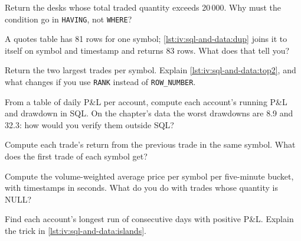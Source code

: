 \begin{interviewq}\label{iq:iv:sql-and-data:3}
Return the desks whose total traded quantity exceeds 20\,000. Why must the condition go in \texttt{HAVING}, not \texttt{WHERE}?
\end{interviewq}

\begin{interviewq}\label{iq:iv:sql-and-data:4}
A quotes table has 81 rows for one symbol; \cref{lst:iv:sql-and-data:dup} joins it to itself on symbol and timestamp and returns 83
rows. What does that tell you?
\end{interviewq}

\label{lst:iv:sql-and-data:top2}

\begin{interviewq}\label{iq:iv:sql-and-data:5}
Return the two largest trades per symbol. Explain \cref{lst:iv:sql-and-data:top2}, and what changes if you use \texttt{RANK} instead of
\texttt{ROW\_NUMBER}.
\end{interviewq}

\begin{interviewq}\label{iq:iv:sql-and-data:6}
From a table of daily P\&L per account, compute each account's running P\&L and drawdown in SQL. On the chapter's data the worst
drawdowns are 8.9 and 32.3: how would you verify them outside SQL?
\end{interviewq}

\begin{interviewq}\label{iq:iv:sql-and-data:7}
Compute each trade's return from the previous trade in the same symbol. What does the first trade of each symbol get?
\end{interviewq}

\begin{interviewq}\label{iq:iv:sql-and-data:8}
Compute the volume-weighted average price per symbol per five-minute bucket, with timestamps in seconds. What do you do with trades
whose quantity is NULL?
\end{interviewq}

\begin{interviewq}\label{iq:iv:sql-and-data:9}
Find each account's longest run of consecutive days with positive P\&L. Explain the trick in \cref{lst:iv:sql-and-data:islands}.
\end{interviewq}

